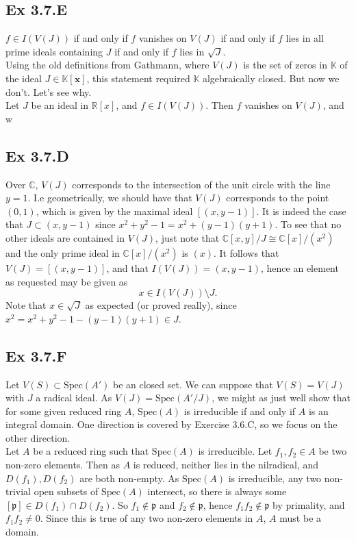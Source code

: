\documentclass{article}
\theoremstyle{definition}
\newcommand{\R}{\mathbb{R}}
\newcommand{\C}{\mathbb{C}}
\newcommand{\K}{\mathbb{K}}
\newcommand{\Kx}{\K[\bm{x}]}
\newcommand{\Spec}{\text{Spec}}
\begin{document}
\subsection*{Ex 3.7.E}

$f \in I(V(J))$ if and only if $f$ vanishes on $V(J)$ if and only if $f$ lies
in all prime ideals containing $J$ if and only if $f$ lies in $\sqrt{J}$. \\

Using the old definitions from Gathmann, where $V(J)$ is the set of zeros in
$\K$ of the ideal $J \in \Kx$, this statement required $\K$ algebraically
closed. But now we don't. Let's see why. \\

Let $J$ be an ideal in $\R[x]$, and $f \in I(V(J))$. Then $f$ vanishes on $V(J)$,
and w

\subsection*{Ex 3.7.D}

Over $\C$, $V(J)$ corresponds to the intersection of the unit circle with the
line $y = 1$. I.e geometrically, we should have that $V(J)$ corresponds to the
point $(0, 1)$, which is given by the maximal ideal $[(x, y - 1)]$. It is
indeed the case that $J \subset (x, y - 1)$ since $x^2 + y^2 - 1 = x^2 + (y -
1)(y + 1)$. To see that no other ideals are contained in $V(J)$, just note that 
$\C[x, y]/J \cong \C[x]/(x^2)$ and the only prime ideal in $\C[x]/(x^2)$ is $(x)$.
It follows that $V(J) = [(x, y - 1)]$, and that $I(V(J)) = (x, y - 1)$, hence 
an element as requested may be given as 
\[
	x \in I(V(J)) \setminus J.
\] 
Note that $x \in \sqrt{J}$ as expected (or proved really), since $x^2 = x^2 +
y^2 - 1 - (y-1)(y+1) \in J$.

\subsection*{Ex 3.7.F}

Let $V(S) \subset \Spec(A')$ be an closed set. We can suppose that $V(S) =
V(J)$ with $J$ a radical ideal. As $V(J) = \Spec(A'/J)$, we might as just well
show that for some given reduced ring $A$, $\Spec(A)$ is irreducible if and
only if $A$ is an integral domain. One direction is covered by Exercise 3.6.C,
so we focus on the other direction. \\

Let $A$ be a reduced ring such that $\Spec(A)$ is irreducible.  Let $f_1, f_2
\in A$ be two non-zero elements. Then as $A$ is reduced, neither lies in the
nilradical, and $D(f_1), D(f_2)$ are both non-empty. As $\Spec(A)$ is
irreducible, any two non-trivial open subsets of $\Spec(A)$ intersect, so there
is always some $[\mathfrak{p}] \in D(f_1) \cap D(f_2)$. So $f_1 \not \in
\mathfrak{p}$ and $f_2 \not \in \mathfrak{p}$, hence $f_1f_2 \not \in
\mathfrak{p}$ by primality, and $f_1f_2 \not = 0$. Since this is true of any
two non-zero elements in $A$, $A$ must be a domain. \\
\end{document}
